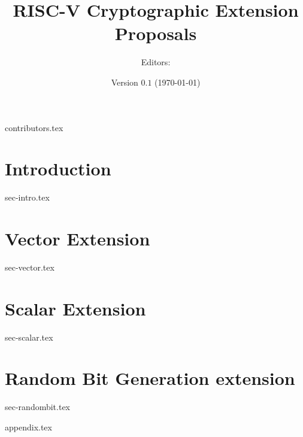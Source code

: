 \documentclass[11pt]{article}
\title{RISC-V Cryptographic Extension Proposals}
\author{Editors: }
\date{Version $0.1$ (\today)}
\begin{document}

\maketitle

{contributors.tex}

\tableofcontents


\newpage
\section{Introduction}
\label{sec:intro}
{sec-intro.tex}

\newpage
\section{Vector Extension}
\label{sec:vector}
{sec-vector.tex}

\newpage
\section{Scalar Extension}
\label{sec:scalar}
{sec-scalar.tex}

\newpage
\section{Random Bit Generation extension}
\label{sec:randombit}
{sec-randombit.tex}


\printbibliography


%
%


\appendix
\label{sec:appendix}
{appendix.tex}

\end{document}
